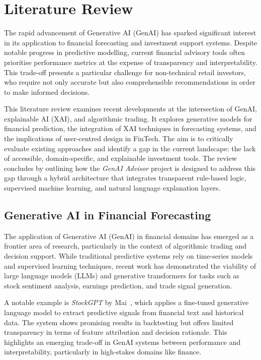 \section{Literature Review}

The rapid advancement of Generative AI (GenAI) has sparked significant interest in its application to financial forecasting and investment support systems. Despite notable progress in predictive modelling, current financial advisory tools often prioritise performance metrics at the expense of transparency and interpretability. This trade-off presents a particular challenge for non-technical retail investors, who require not only accurate but also comprehensible recommendations in order to make informed decisions.

This literature review examines recent developments at the intersection of GenAI, explainable AI (XAI), and algorithmic trading. It explores generative models for financial prediction, the integration of XAI techniques in forecasting systems, and the implications of user-centred design in FinTech. The aim is to critically evaluate existing approaches and identify a gap in the current landscape: the lack of accessible, domain-specific, and explainable investment tools. The review concludes by outlining how the \textit{GenAI Advisor} project is designed to address this gap through a hybrid architecture that integrates transparent rule-based logic, supervised machine learning, and natural language explanation layers.

\subsection{Generative AI in Financial Forecasting}

The application of Generative AI (GenAI) in financial domains has emerged as a frontier area of research, particularly in the context of algorithmic trading and decision support. While traditional predictive systems rely on time-series models and supervised learning techniques, recent work has demonstrated the viability of large language models (LLMs) and generative transformers for tasks such as stock sentiment analysis, earnings prediction, and trade signal generation.

A notable example is \textit{StockGPT} by Mai~\cite{mai2024stockgpt}, which applies a fine-tuned generative language model to extract predictive signals from financial text and historical data. The system shows promising results in backtesting but offers limited transparency in terms of feature attribution and decision rationale. This highlights an emerging trade-off in GenAI systems between performance and interpretability, particularly in high-stakes domains like finance.

